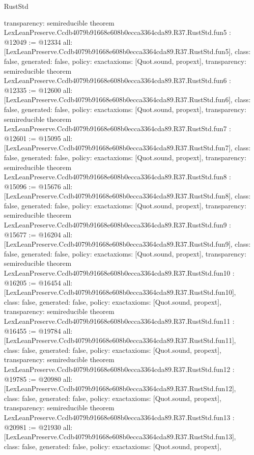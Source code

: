 \begin{lexlean}{RustStd}
\begin{coremodule}
{  transparency: semireducible
}
theorem LexLeanPreserve.Ccdb4079b91668e608b0ecca3364cda89.R37.RustStd.fun5 : @12049 := @12334 {
  all: [LexLeanPreserve.Ccdb4079b91668e608b0ecca3364cda89.R37.RustStd.fun5],
  class: false,
  generated: false,
  policy: exact{axioms: [Quot.sound, propext]},
  transparency: semireducible
}
theorem LexLeanPreserve.Ccdb4079b91668e608b0ecca3364cda89.R37.RustStd.fun6 : @12335 := @12600 {
  all: [LexLeanPreserve.Ccdb4079b91668e608b0ecca3364cda89.R37.RustStd.fun6],
  class: false,
  generated: false,
  policy: exact{axioms: [Quot.sound, propext]},
  transparency: semireducible
}
theorem LexLeanPreserve.Ccdb4079b91668e608b0ecca3364cda89.R37.RustStd.fun7 : @12601 := @15095 {
  all: [LexLeanPreserve.Ccdb4079b91668e608b0ecca3364cda89.R37.RustStd.fun7],
  class: false,
  generated: false,
  policy: exact{axioms: [Quot.sound, propext]},
  transparency: semireducible
}
theorem LexLeanPreserve.Ccdb4079b91668e608b0ecca3364cda89.R37.RustStd.fun8 : @15096 := @15676 {
  all: [LexLeanPreserve.Ccdb4079b91668e608b0ecca3364cda89.R37.RustStd.fun8],
  class: false,
  generated: false,
  policy: exact{axioms: [Quot.sound, propext]},
  transparency: semireducible
}
theorem LexLeanPreserve.Ccdb4079b91668e608b0ecca3364cda89.R37.RustStd.fun9 : @15677 := @16204 {
  all: [LexLeanPreserve.Ccdb4079b91668e608b0ecca3364cda89.R37.RustStd.fun9],
  class: false,
  generated: false,
  policy: exact{axioms: [Quot.sound, propext]},
  transparency: semireducible
}
theorem LexLeanPreserve.Ccdb4079b91668e608b0ecca3364cda89.R37.RustStd.fun10 : @16205 := @16454 {
  all: [LexLeanPreserve.Ccdb4079b91668e608b0ecca3364cda89.R37.RustStd.fun10],
  class: false,
  generated: false,
  policy: exact{axioms: [Quot.sound, propext]},
  transparency: semireducible
}
theorem LexLeanPreserve.Ccdb4079b91668e608b0ecca3364cda89.R37.RustStd.fun11 : @16455 := @19784 {
  all: [LexLeanPreserve.Ccdb4079b91668e608b0ecca3364cda89.R37.RustStd.fun11],
  class: false,
  generated: false,
  policy: exact{axioms: [Quot.sound, propext]},
  transparency: semireducible
}
theorem LexLeanPreserve.Ccdb4079b91668e608b0ecca3364cda89.R37.RustStd.fun12 : @19785 := @20980 {
  all: [LexLeanPreserve.Ccdb4079b91668e608b0ecca3364cda89.R37.RustStd.fun12],
  class: false,
  generated: false,
  policy: exact{axioms: [Quot.sound, propext]},
  transparency: semireducible
}
theorem LexLeanPreserve.Ccdb4079b91668e608b0ecca3364cda89.R37.RustStd.fun13 : @20981 := @21930 {
  all: [LexLeanPreserve.Ccdb4079b91668e608b0ecca3364cda89.R37.RustStd.fun13],
  class: false,
  generated: false,
  policy: exact{axioms: [Quot.sound, propext]},
}
\end{coremodule}
\end{lexlean}
